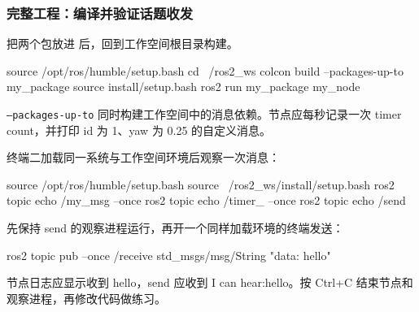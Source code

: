 \subsubsection{完整工程：编译并验证话题收发}
\begin{example}
把两个包放进  后，回到工作空间根目录构建。
\par\medskip\noindent\begin{minipage}{\linewidth}
\begin{tbash}
source /opt/ros/humble/setup.bash
cd ~/ros2_ws
colcon build --packages-up-to my_package
source install/setup.bash
ros2 run my_package my_node
\end{tbash}
\end{minipage}\par\smallskip
\texttt{--packages-up-to} 同时构建工作空间中的消息依赖。节点应每秒记录一次 timer count，并打印 id 为 1、yaw 为 0.25 的自定义消息。

终端二加载同一系统与工作空间环境后观察一次消息：
\par\medskip\noindent\begin{minipage}{\linewidth}
\begin{tbash}
source /opt/ros/humble/setup.bash
source ~/ros2_ws/install/setup.bash
ros2 topic echo /my_msg --once
ros2 topic echo /timer_ --once
ros2 topic echo /send
\end{tbash}
\end{minipage}\par\smallskip
先保持 send 的观察进程运行，再开一个同样加载环境的终端发送：
\par\medskip\noindent\begin{minipage}{\linewidth}
\begin{tbash}
ros2 topic pub --once /receive std_msgs/msg/String "{data: hello}"
\end{tbash}
\end{minipage}\par\smallskip
节点日志应显示收到 hello，send 应收到 I can hear:hello。按 Ctrl+C 结束节点和观察进程，再修改代码做练习。
\end{example}

